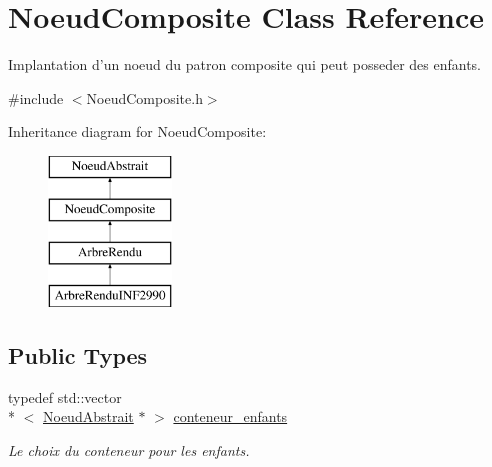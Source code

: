 \hypertarget{class_noeud_composite}{\section{Noeud\-Composite Class Reference}
\label{class_noeud_composite}
}


Implantation d'un noeud du patron composite qui peut posseder des enfants.  




{\ttfamily \#include $<$Noeud\-Composite.\-h$>$}

Inheritance diagram for Noeud\-Composite\-:\begin{figure}[H]
\begin{center}
\leavevmode
\includegraphics[height=4.000000cm]{class_noeud_composite}
\end{center}
\end{figure}
\subsection*{Public Types}
\begin{DoxyCompactItemize}
\item 
typedef std\-::vector\\*
$<$ \hyperlink{class_noeud_abstrait}{Noeud\-Abstrait} $\ast$ $>$ \hyperlink{class_noeud_composite_a697e52516e154d6943a1e1aa9533c317}{conteneur\-\_\-enfants}
\begin{DoxyCompactList}\small\item\em Le choix du conteneur pour les enfants. \end{DoxyCompactList}\end{DoxyCompactItemize}

